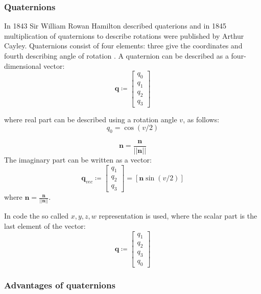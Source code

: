 \documentclass[12pt,a4paper,twoside]{article}
\begin{document}
\subsubsection{Quaternions}

In 1843 Sir William Rowan Hamilton described quaterions\cite{hamilton1844lxxviii} and in 1845 multiplication of quaternions to describe rotations were published by Arthur Cayley\cite{cayley1845xiii}. Quaternions consist of four elements: three give the coordinates and fourth describing angle of rotation \citet{courant1953methods}.
A quaternion can be described as a four-dimensional vector:
\begin{equation}
\bm{q} \coloneqq \begin{bmatrix}
q_0 \\
q_1 \\
q_2 \\
q_3
\end{bmatrix}
\end{equation}

where real part can be described using a rotation angle $v$, as follows:
\begin{equation}
q_0 = \cos(v/2)
\end{equation}

\begin{equation}
\bm{n} = \frac{\bm{n}}{||\bm{n}||}
\end{equation}
The imaginary part can be written as a vector:
\begin{equation}
\bm{q}_{vec} \coloneqq \begin{bmatrix}
q_1 \\
q_2 \\
q_3
\end{bmatrix}
= [\bm{n}\sin(v/2)]
\end{equation}
where $\bm{n} = \frac{\bm{n}}{||\bm{n}||}$.

In code the so called $x,y,z,w$ representation is used, where the scalar part is the last element of the vector:
\begin{equation} \label{eq:code_quaternion}
\bm{q} \coloneqq \begin{bmatrix}
q_1 \\
q_2 \\
q_3 \\
q_0
\end{bmatrix}
\end{equation}

\subsubsection{Advantages of quaternions}
\end{document}
